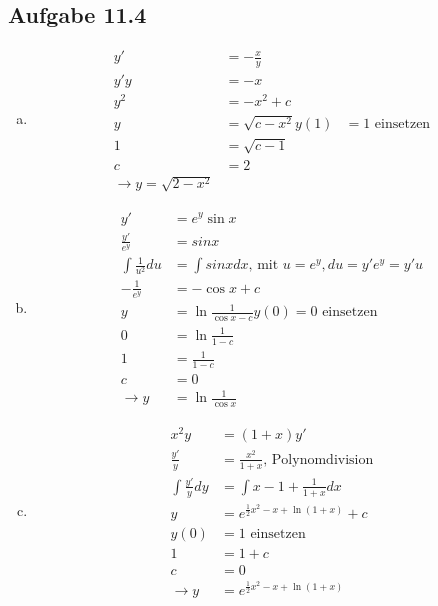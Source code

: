 \documentclass{standalone}
\begin{document}
\subsection{Aufgabe 11.4}
\begin{enumerate}[a)]
    \item \begin{align}
        y' &= -\frac{x}{y} \\
        y'y &= -x \\
        y^2 &= -x^2 + c \\
        y &= \sqrt{c-x^2}
        y(1) &= 1 \text{ einsetzen} \\
        1 &= \sqrt{c-1} \\
        c &= 2 \\
        \rightarrow y = \sqrt{2-x^2}
    \end{align}
    \item \begin{align}
        y' &= e^y\sin x \\
        \frac{y'}{e^y} &= sin x \\
        \int \frac{1}{u^2}du &= \int sin x dx \text{, mit } u = e^y, du = y'e^y = y'u \\
        -\frac{1}{e^y} &= -\cos x + c \\
        y &= \ln \frac{1}{\cos x - c}
        y(0) = 0 \text{ einsetzen} \\
        0 &= \ln \frac{1}{1-c} \\
        1 &= \frac{1}{1-c} \\
        c &= 0 \\
        \rightarrow y &= \ln \frac{1}{\cos x}
    \end{align}
    \item \begin{align}
        x^2 y &= (1+x)y' \\
        \frac{y'}{y} &= \frac{x^2}{1+x} \text{, Polynomdivision} \\
        \int \frac{y'}{y}dy &= \int x - 1 + \frac{1}{1+x}dx \\
        y &= e^{\frac{1}{2}x^2 - x + \ln (1+x)} + c \\
        y(0) &= 1 \text{ einsetzen} \\
        1 &= 1 + c\\
        c &= 0 \\
        \rightarrow y &= e^{\frac{1}{2}x^2 - x + \ln (1+x)}
    \end{align}
\end{enumerate}
\end{document}
